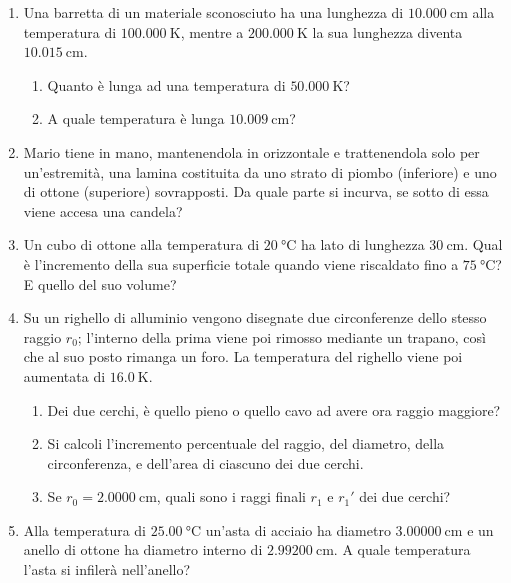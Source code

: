 \begin{enumerate}

    \item Una barretta di un materiale sconosciuto ha una lunghezza di $\SI{10,000}{\cm}$ alla temperatura di $\SI{100,000}{\kelvin}$, mentre a $\SI{200,000}{\kelvin}$ la sua lunghezza diventa $\SI{10,015}{\cm}$.
    \begin{enumerate}
        \item Quanto è lunga ad una temperatura di $\SI{50,000}{\kelvin}$?
        \item A quale temperatura è lunga $\SI{10,009}{\cm}$?
    \end{enumerate}
    
    \item Mario tiene in mano, mantenendola in orizzontale e trattenendola solo per un'estremità, una lamina costituita da uno strato di piombo (inferiore) e uno di ottone (superiore) sovrapposti. Da quale parte si incurva, se sotto di essa viene accesa una candela?

    \item Un cubo di ottone alla temperatura di $\SI{20}{\celsius}$ ha lato di lunghezza $\SI{30}{\cm}$. Qual è l'incremento della sua superficie totale quando viene riscaldato fino a $\SI{75}{\celsius}$? E quello del suo volume?

    \item Su un righello di alluminio vengono disegnate due circonferenze dello stesso raggio $r_0$; l'interno della prima viene poi rimosso mediante un trapano, così che al suo posto rimanga un foro.
    La temperatura del righello viene poi aumentata di $\SI{16,0}{\kelvin}$.
    \begin{enumerate}
        \item Dei due cerchi, è quello pieno o quello cavo ad avere ora raggio maggiore?
        \item Si calcoli l'incremento percentuale del raggio, del diametro, della circonferenza, e dell'area di ciascuno dei due cerchi.
        \item Se $r_0=\SI{2.0000}{\cm}$, quali sono i raggi finali $r_1$ e $r_1'$ dei due cerchi?
    \end{enumerate}
    
    \item Alla temperatura di $\SI{25,00}{\celsius}$ un'asta di acciaio ha diametro $\SI{3,00000}{\cm}$ e un anello di ottone ha diametro interno di $\SI{2,99200}{\cm}$. A quale temperatura l'asta si infilerà nell'anello?
    

\end{enumerate}
